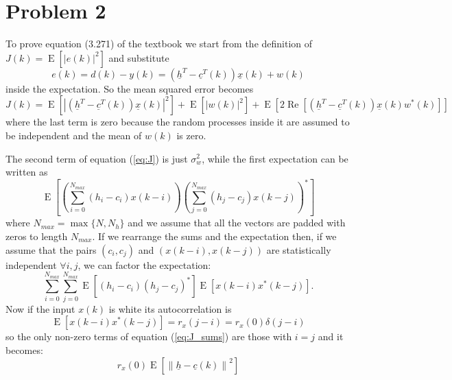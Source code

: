 \documentclass[a4paper,oneside]{article}
\renewcommand{\vec}[1]{\underline{#1}}
\renewcommand{\Re}[1]{\operatorname{Re}\left[#1\right]}
\newcommand{\E}[1]{\operatorname{E}\left[#1\right]}
\newcommand{\norm}[1]{\left\lVert#1\right\rVert}
\newcommand{\abs}[1]{\left|#1\right|}
\begin{document}
\section*{Problem 2}
To prove equation (3.271) of the textbook we start from the definition
of $J(k) = \E{\abs{e(k)}^2}$ and substitute
\[ e(k) = d(k) - y(k) = \left(\vec{h}^T - \vec{c}^T(k) \right) \vec{x}(k) + w(k) \]
inside the expectation. So the mean squared error becomes
\begin{equation}
  J(k) = \E{\abs{\left(\vec{h}^T - \vec{c}^T(k) \right) \vec{x}(k)}^2}
  + \E{\abs{w(k)}^2}
  + \E{2\Re{\left(\vec{h}^T - \vec{c}^T(k) \right) \vec{x}(k) w^*(k)}}
  \label{eq:J}
\end{equation}
where the last term is zero because the random processes inside it are
assumed to be independent and the mean of $w(k)$ is zero.

The second term of equation (\ref{eq:J}) is just $\sigma^2_w$, while
the first expectation can be written as
\[ \E{
  \left(\sum_{i=0}^{N_{max}}\left(h_i - c_i\right)x(k-i)\right)
  \left(\sum_{j=0}^{N_{max}}\left(h_j - c_j\right)x(k-j)\right)^* } \]
where $N_{max} = \max\{N, N_h\}$ and we assume that all the vectors
are padded with zeros to length $N_{max}$.  If we rearrange the sums
and the expectation then, if we assume that the pairs $(c_i,c_j)$ and
$(x(k-i),x(k-j))$ are statistically independent $\forall i,j$, we can
factor the expectation:
\begin{equation}
\sum_{i=0}^{N_{max}}\sum_{j=0}^{N_{max}}
\E{(h_i -c_i)(h_j-c_j)^*}
\E{x(k-i)x^*(k-j)} .
\label{eq:J_sums}
\end{equation}
Now if the input $x(k)$ is white its autocorrelation is
\[
\E{x(k-i)x^*(k-j)} = r_x(j-i) = r_x(0)\delta(j-i)
\]
so the only non-zero terms of equation (\ref{eq:J_sums}) are those
with $i=j$ and it becomes:
\begin{equation}
  r_x(0)\E{\norm{\vec{h}-\vec{c}(k)}^2}
  \label{eq:J_final_diff}
\end{equation}
\end{document}
